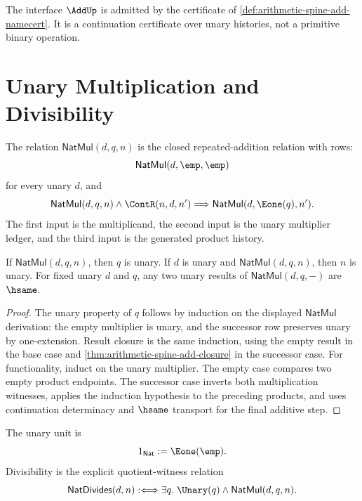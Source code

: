 \begin{corollary}
\label{cor:arithmetic-spine-add-admission}
The interface $\AddUp$ is admitted by the certificate of
\autoref{def:arithmetic-spine-add-namecert}.  It is a continuation
certificate over unary histories, not a primitive binary operation.
\end{corollary}

\section{Unary Multiplication and Divisibility}
\label{sec:arithmetic-spine-mul}

\begin{definition}
\label{def:arithmetic-spine-natmul}
The relation $\mathsf{NatMul}(d,q,n)$ is the closed repeated-addition
relation with rows:
$$
\mathsf{NatMul}(d,\emp,\emp)
$$
for every unary $d$, and
$$
\mathsf{NatMul}(d,q,n)\wedge\ContR(n,d,n')
\Longrightarrow
\mathsf{NatMul}(d,\Eone(q),n').
$$
The first input is the multiplicand, the second input is the unary
multiplier ledger, and the third input is the generated product history.
\end{definition}

\begin{theorem}
\label{thm:arithmetic-spine-mul-closure-functionality}
If $\mathsf{NatMul}(d,q,n)$, then $q$ is unary.  If $d$ is unary and
$\mathsf{NatMul}(d,q,n)$, then $n$ is unary.  For fixed unary $d$ and $q$,
any two unary results of $\mathsf{NatMul}(d,q,-)$ are $\hsame$.
\end{theorem}

\begin{proof}
The unary property of $q$ follows by induction on the displayed
$\mathsf{NatMul}$ derivation: the empty multiplier is unary, and the
successor row preserves unary by one-extension.  Result closure is the same
induction, using the empty result in the base case and
\autoref{thm:arithmetic-spine-add-closure} in the successor case.  For
functionality, induct on the unary multiplier.  The empty case compares two
empty product endpoints.  The successor case inverts both multiplication
witnesses, applies the induction hypothesis to the preceding products, and
uses continuation determinacy and $\hsame$ transport for the final additive
step.
\end{proof}

\begin{definition}
\label{def:arithmetic-spine-unit-divides}
The unary unit is
$$
1_{\mathsf{Nat}}:=\Eone(\emp).
$$
Divisibility is the explicit quotient-witness relation
$$
\mathsf{NatDivides}(d,n)
:\Longleftrightarrow
\exists q.\;\Unary(q)\wedge\mathsf{NatMul}(d,q,n).
$$
\end{definition}

